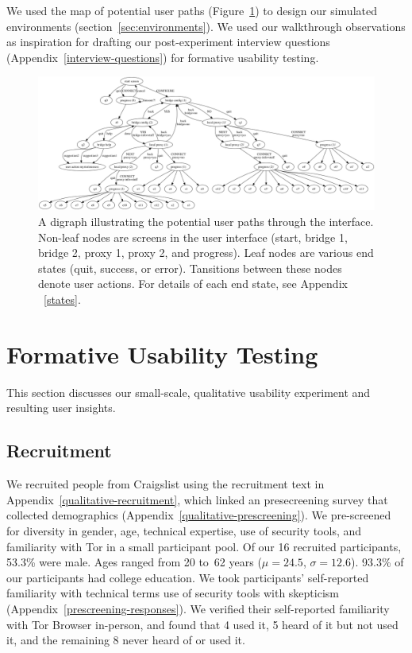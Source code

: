 \documentclass[USenglish,oneside,twocolumn]{article}
\begin{document}
We used the map of potential user paths (Figure~\ref{fig:digraph}) to design our simulated environments (section~\ref{sec:environments}).  We used our walkthrough observations as inspiration for drafting our post-experiment interview questions (Appendix~\ref{interview-questions}) for formative usability testing. 

\begin{figure}
\centering
\includegraphics[width=\textwidth]{tor-digraph.png}
\caption{
A digraph illustrating the potential user paths through the interface. Non-leaf nodes are screens in the user interface (start, bridge 1, bridge 2, proxy 1, proxy 2, and progress). Leaf nodes are various end states (quit, success, or error). Tansitions between these nodes denote user actions. For details of each end state, see Appendix ~\ref{states}. 
}
\label{fig:digraph}
\end{figure} 

\section{Formative Usability Testing}
\label{sec:qualitative}
This section discusses our small-scale, qualitative usability experiment and resulting user insights. 

\subsection{Recruitment}
We recruited people from Craigslist using the recruitment text in Appendix~\ref{qualitative-recruitment}, which linked an presecreening survey that collected demographics (Appendix~\ref{qualitative-prescreening}). We pre-screened~\cite{screening} for diversity in gender, age, technical expertise, use of security tools, and familiarity with Tor in a small participant pool. Of our 16 recruited participants, 53.3\% were male. Ages ranged from 20 to~62 years ($\mu = 24.5$, $\sigma = 12.6$). 93.3\% of our participants had college education. We took participants' self-reported familiarity with technical terms use of security tools with skepticism (Appendix~\ref{prescreening-responses}). We verified their self-reported familiarity with Tor Browser in-person, and found that 4 used it, 5 heard of it but not used it, and the remaining 8 never heard of or used it.  
\end{document}
